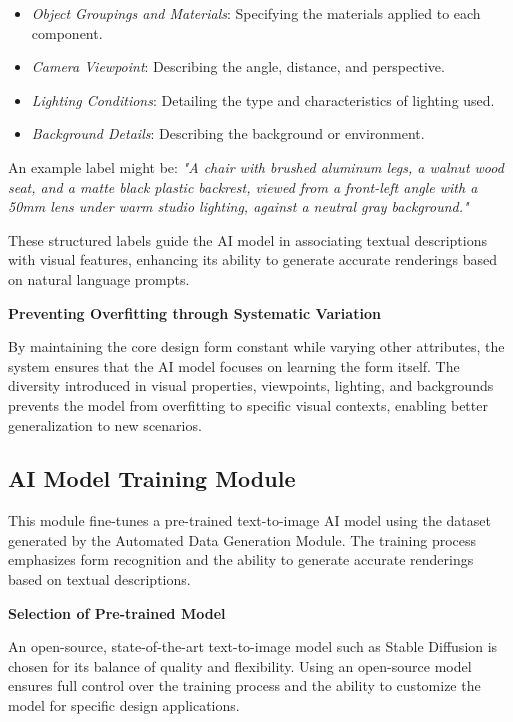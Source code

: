 \documentclass{article}
\begin{document}
\begin{itemize}
    \item \textit{Object Groupings and Materials}: Specifying the materials applied to each component.
    \item \textit{Camera Viewpoint}: Describing the angle, distance, and perspective.
    \item \textit{Lighting Conditions}: Detailing the type and characteristics of lighting used.
    \item \textit{Background Details}: Describing the background or environment.
\end{itemize}

An example label might be: \textit{"A chair with brushed aluminum legs, a walnut wood seat, and a matte black plastic backrest, viewed from a front-left angle with a 50mm lens under warm studio lighting, against a neutral gray background."}

These structured labels guide the AI model in associating textual descriptions with visual features, enhancing its ability to generate accurate renderings based on natural language prompts.

\textbf{Preventing Overfitting through Systematic Variation}

By maintaining the core design form constant while varying other attributes, the system ensures that the AI model focuses on learning the form itself. The diversity introduced in visual properties, viewpoints, lighting, and backgrounds prevents the model from overfitting to specific visual contexts, enabling better generalization to new scenarios.

\subsection{AI Model Training Module}

This module fine-tunes a pre-trained text-to-image AI model using the dataset generated by the Automated Data Generation Module. The training process emphasizes form recognition and the ability to generate accurate renderings based on textual descriptions.

\textbf{Selection of Pre-trained Model}

An open-source, state-of-the-art text-to-image model such as Stable Diffusion is chosen for its balance of quality and flexibility. Using an open-source model ensures full control over the training process and the ability to customize the model for specific design applications.
\end{document}
